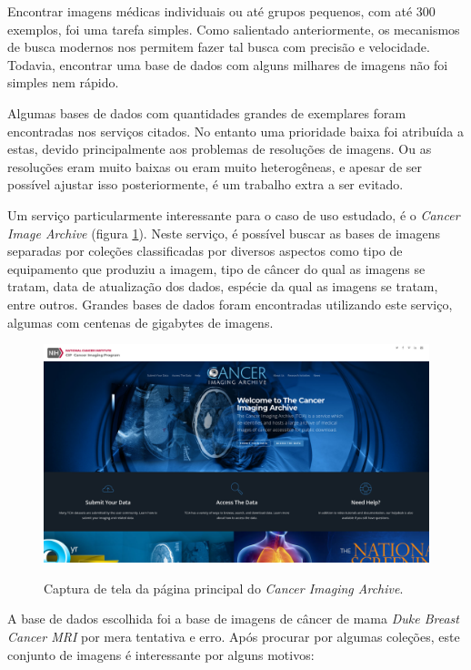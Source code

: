 Encontrar imagens médicas individuais ou até grupos pequenos, com até 300 exemplos, foi uma tarefa simples. Como salientado anteriormente, os mecanismos de busca modernos nos permitem fazer tal busca com precisão e velocidade. Todavia, encontrar uma base de dados com alguns milhares de imagens não foi simples nem rápido.

Algumas bases de dados com quantidades grandes de exemplares foram encontradas nos serviços citados. No entanto uma prioridade baixa foi atribuída a estas, devido principalmente aos problemas de resoluções de imagens. Ou as resoluções eram muito baixas ou eram muito heterogêneas, e apesar de ser possível ajustar isso posteriormente, é um trabalho extra a ser evitado.

Um serviço particularmente interessante para o caso de uso estudado, é o \textit{Cancer Image Archive} \cite{cancer_imaging_archive_cancer_2022} (figura \ref{fig:fig14}). Neste serviço, é possível buscar as bases de imagens separadas por coleções classificadas por diversos aspectos como tipo de equipamento que produziu a imagem, tipo de câncer do qual as imagens se tratam, data de atualização dos dados, espécie da qual as imagens se tratam, entre outros. Grandes bases de dados foram encontradas utilizando este serviço, algumas com centenas de gigabytes de imagens.

\begin{figure}[H]
    \centering
    \caption{Captura de tela da página principal do \textit{Cancer Imaging Archive}.}
    \includegraphics[width=13cm]{fig/cancer_imaging_archive.png}
    \label{fig:fig14}
\end{figure}

A base de dados escolhida foi a base de imagens de câncer de mama \textit{Duke Breast Cancer MRI} \cite{saha_machine_2018} por mera tentativa e erro. Após procurar por algumas coleções, este conjunto de imagens é interessante por alguns motivos:

